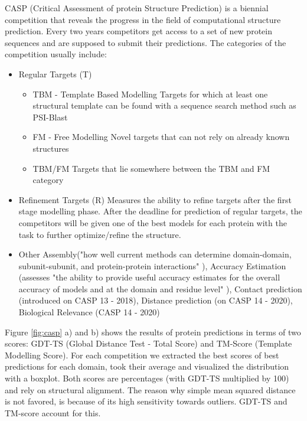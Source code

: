 CASP (Critical Assessment of protein Structure Prediction) is a biennial competition that reveals the progress in the field of computational structure prediction. Every two years competitors get access to a set of new protein sequences and are supposed to submit their predictions. The categories of the competition usually include:
\begin{itemize}
    \item Regular Targets (T)
    
    \begin{itemize}
        \item TBM - Template Based Modelling
        Targets for which at least one structural template can be found with a sequence search method such as PSI-Blast%
        \item FM - Free Modelling
        Novel targets that can not rely on already known structures
        \item TBM/FM
        Targets that lie somewhere between the TBM and FM category
    \end{itemize}
    
    \item Refinement Targets (R)
        Measures the ability to refine targets after the first stage modelling phase. After the deadline for prediction of regular targets, the competitors will be given one of the best models for each protein with the task to further optimize/refine the structure.
        
    \item Other
    Assembly("how well current methods can determine domain-domain, subunit-subunit, and protein-protein interactions" \cite{casp}), Accuracy Estimation (assesses "the ability to provide useful accuracy estimates for the overall accuracy of models and at the domain and residue level" \cite{casp}), Contact prediction (introduced on CASP 13 - 2018), Distance prediction (on CASP 14 - 2020), Biological Relevance (CASP 14 - 2020) \cite{casp, casp13}
\end{itemize}

Figure \ref{fig:casp} a) and b) shows the results of protein predictions in terms of two scores: GDT-TS (Global Distance Test - Total Score) and TM-Score (Template Modelling Score). For each competition we extracted the best scores of best predictions for each domain, took their average and visualized the distribution with a boxplot.
Both scores are percentages (with GDT-TS multiplied by 100) and rely on structural alignment. The reason why simple mean squared distance is not favored, is because of its high sensitivity towards outliers. GDT-TS and TM-score account for this. 

